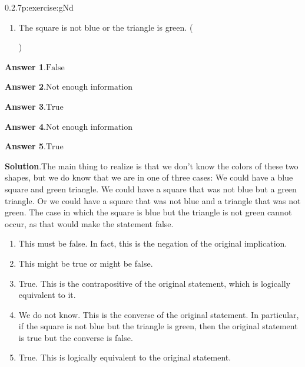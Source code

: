 \documentclass[twoside,11pt,]{book}
\newcommand{\blocktitlefont}{\relax}
\numberwithin{equation}{chapter}
\begin{document}
\begin{divisionsolution}{0.2.7}{}{p:exercise:gNd}
\begin{enumerate}[label=(\alph*)]
)\quad
%
\item{}The square is not blue or the triangle is green. \quad()\quad
%
\end{enumerate}
%
\par\smallskip%
\noindent\textbf{\blocktitlefont Answer 1}.\quad{}\(\text{False}\)%
\par\smallskip%
\noindent\textbf{\blocktitlefont Answer 2}.\quad{}\(\text{Not enough information}\)%
\par\smallskip%
\noindent\textbf{\blocktitlefont Answer 3}.\quad{}\(\text{True}\)%
\par\smallskip%
\noindent\textbf{\blocktitlefont Answer 4}.\quad{}\(\text{Not enough information}\)%
\par\smallskip%
\noindent\textbf{\blocktitlefont Answer 5}.\quad{}\(\text{True}\)%
\par\smallskip%
\noindent\textbf{\blocktitlefont Solution}.\quad{}The main thing to realize is that we don't know the colors of these two shapes, but we do know that we are in one of three cases: We could have a blue square and green triangle. We could have a square that was not blue but a green triangle. Or we could have a square that was not blue and a triangle that was not green. The case in which the square is blue but the triangle is not green cannot occur, as that would make the statement false.%
\begin{enumerate}[label=(\alph*)]
\item{}This must be false. In fact, this is the negation of the original implication.%
\item{}This might be true or might be false.%
\item{}True. This is the contrapositive of the original statement, which is logically equivalent to it.%
\item{}We do not know. This is the converse of the original statement. In particular, if the square is not blue but the triangle is green, then the original statement is true but the converse is false.%
\item{}True. This is logically equivalent to the original statement.%
\end{enumerate}
%
\end{divisionsolution}%
\end{document}
